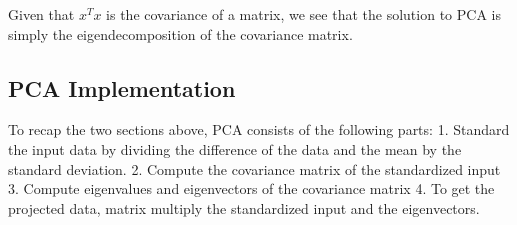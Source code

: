 \documentclass[11pt]{article}
\begin{document}
Given that \(x^Tx\) is the covariance of a matrix, we see that the
solution to PCA is simply the eigendecomposition of the covariance
matrix.

    \subsection{PCA Implementation}\label{pca-implementation}

To recap the two sections above, PCA consists of the following parts: 1.
Standard the input data by dividing the difference of the data and the
mean by the standard deviation. 2. Compute the covariance matrix of the
standardized input 3. Compute eigenvalues and eigenvectors of the
covariance matrix 4. To get the projected data, matrix multiply the
standardized input and the eigenvectors.
\end{document}
